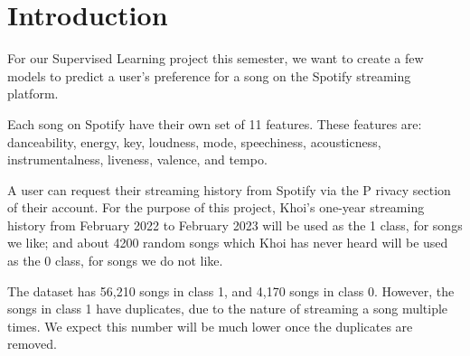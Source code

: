 \section{Introduction}

For our Supervised Learning project this semester, we want to create a few models to predict a user's preference for a song on the Spotify streaming platform.

Each song on Spotify have their own set of 11 features. These features are: danceability, energy, key, loudness, mode, speechiness, acousticness, instrumentalness, liveness, valence, and tempo.

A user can request their streaming history from Spotify via the P rivacy section of their account. For the purpose of this project, Khoi's one-year streaming history from February 2022 
to February 2023 will be used as the 1 class, for songs we like; and about 4200 random songs which Khoi has never heard will be used as the 0 class, for songs we do not like.

The dataset has 56,210 songs in class 1, and 4,170 songs in class 0. However, the songs in class 1 have duplicates, due to the nature of streaming a song multiple times.
We expect this number will be much lower once the duplicates are removed.